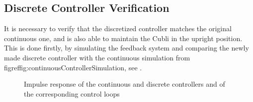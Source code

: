 \subsection{Discrete Controller Verification}\label{ssec:discreteControllerVerification}
It is necessary to verify that the discretized controller matches the original continuous one, and is also able to maintain the Cubli in the upright position. This is done firstly, by simulating the feedback system and comparing the newly made discrete controller with the continuous simulation from figref{fig:continuousControllerSimulation}, see .
%
\begin{figure}[H]
  \centering
  \caption{Impulse response of the continuous and discrete controllers and of the corresponding control loops}
  \label{fig:discreteVsContinuousSimulation}
\end{figure} 